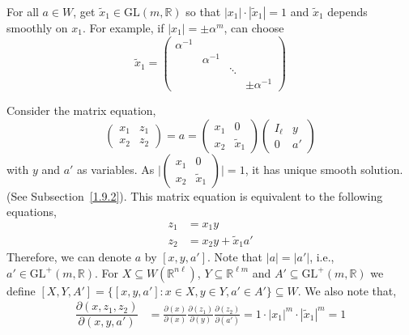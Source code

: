 \documentclass[11pt]{article}
\theoremstyle{definition}
\begin{document}
For all $a \in W$, get $\widetilde{x}_1 \in \mathrm{GL}(m, \mathbb{R})$ so that $|x_1| \cdot |\widetilde{x}_1|=1$ and $\widetilde{x}_1$ depends smoothly on $x_1$.
For example, if $|x_1|= \pm \alpha ^m$, can choose
\[
    \widetilde{x}_1=
    \begin{pmatrix}
        \alpha ^{-1} &   \\
        & \alpha ^{-1} \\
        &              & \ddots \\
        &              &              & \pm \alpha ^{-1}
    \end{pmatrix}
\]

Consider the matrix equation,
\begin{equation}\label{eq1.12}
    \begin{pmatrix}
        x_1 & z_1  \\
        x_2 & z_2
    \end{pmatrix}
    =a=
    \begin{pmatrix}
        x_1 & 0  \\
        x_2 & \widetilde{x}_1
    \end{pmatrix}
    \begin{pmatrix}
        I_\ell & y  \\
        0      & a'
    \end{pmatrix}
\end{equation}
with $y$ and $a'$ as variables.
As $\bigg|
\begin{pmatrix}
    x_1 & 0  \\
    x_2 & \widetilde{x}_1
\end{pmatrix} \bigg| =1$, it has unique smooth solution.
(See Subsection~\ref{1.9.2}).
This matrix equation is equivalent to the following equations,
\begin{equation}\label{eq1.13}
    \begin{split}
        z_1 &= x_1y\\
        z_2 &= x_2y + \widetilde{x}_1 a'
    \end{split}
\end{equation}
Therefore, we can denote $a$ by $[x,y,  a']$.
Note that $|a|=|a'|$, i.e., $a' \in \mathrm{GL}^+(m, \mathbb{R})$.
For $X \subseteq W(\mathbb{R}^{n\ell })$, $Y \subseteq \mathbb{R}^{\ell m}$ and $A' \subseteq \mathrm{GL}^+(m, \mathbb{R})$ we define $[X,Y,A']=\{[x,y, a']: x \in X, y \in Y, a' \in A'\} \subseteq W$.
We also note that,
\begin{align}\label{eq1.14}
    \dfrac{\partial (x, z_1, z_2)}{\partial (x, y, a')} &= \frac{\partial (x)}{\partial (x)} \frac{\partial (z_1)}{\partial (y)} \frac{\partial (z_2)}{\partial (a')} = 1 \cdot |x_1|^m \cdot |\widetilde{x}_1|^m = 1
\end{align}
\end{document}
